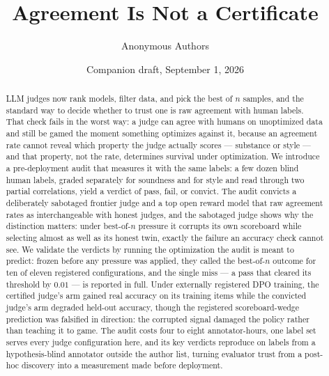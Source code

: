 \documentclass[11pt]{article}
\title{Agreement Is Not a Certificate}
\author{Anonymous Authors}
\date{Companion draft, September 1, 2026}
\begin{document}
\maketitle

\begin{abstract}
\noindent
LLM judges now rank models, filter data, and pick the best of $n$ samples, and the standard way to decide whether to trust one is raw agreement with human labels.
That check fails in the worst way: a judge can agree with humans on unoptimized data and still be gamed the moment something optimizes against it, because an agreement rate cannot reveal which property the judge actually scores --- substance or style --- and that property, not the rate, determines survival under optimization.
We introduce a pre-deployment audit that measures it with the same labels: a few dozen blind human labels, graded separately for soundness and for style and read through two partial correlations, yield a verdict of pass, fail, or convict.
The audit convicts a deliberately sabotaged frontier judge and a top open reward model that raw agreement rates as interchangeable with honest judges, and the sabotaged judge shows why the distinction matters: under best-of-$n$ pressure it corrupts its own scoreboard while selecting almost as well as its honest twin, exactly the failure an accuracy check cannot see.
We validate the verdicts by running the optimization the audit is meant to predict: frozen before any pressure was applied, they called the best-of-$n$ outcome for ten of eleven registered configurations, and the single miss --- a pass that cleared its threshold by $0.01$ --- is reported in full.
Under externally registered DPO training, the certified judge's arm gained real accuracy on its training items while the convicted judge's arm degraded held-out accuracy, though the registered scoreboard-wedge prediction was falsified in direction: the corrupted signal damaged the policy rather than teaching it to game.
The audit costs four to eight annotator-hours, one label set serves every judge configuration here, and its key verdicts reproduce on labels from a hypothesis-blind annotator outside the author list, turning evaluator trust from a post-hoc discovery into a measurement made before deployment.
\end{abstract}
\end{document}
